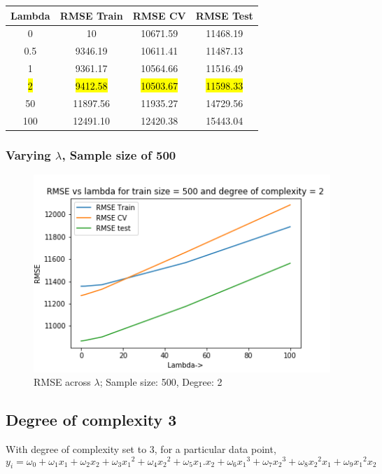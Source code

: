 \documentclass[12pt,a4paper]{article}
\begin{document}
 
\begin{center}
\begin{tabular}{c c c c} 
\hline
\hline
\textbf{Lambda} & \textbf{RMSE Train} & \textbf{RMSE CV} & \textbf{RMSE Test} \\
\hline
\hline
0 & 10 & 10671.59 & 11468.19 \\ 
0.5 & 9346.19 & 10611.41 & 11487.13 \\
1 & 9361.17 & 10564.66 & 11516.49 \\
\hl{2} & \hl{9412.58} & \hl{10503.67} & \hl{11598.33} \\
50 & 11897.56 & 11935.27 & 14729.56  \\ 
100 & 12491.10 & 12420.38 & 15443.04 \\
\hline
\end{tabular}
\label{d250}
\end{center}
 
\subsubsection{Varying $\lambda$, Sample size of 500}
\begin{figure}[H]
     \centering
     \includegraphics[scale=0.7]{images/d2_500.png}
     \caption{RMSE across $\lambda$; Sample size: 500, Degree: 2}
     \label{fig:d2500}
\end{figure}
 



\subsection{Degree of complexity 3}
With degree of complexity set to 3, for a particular data point, 
\begin{equation}
y_{i}=\omega_{0}+\omega_{1}{x_1}+\omega_{2}{x_2}+\omega_{3}{x_1}^2+\omega_{4}{x_2}^2+\omega_{5}{x_1}.{x_2}+\omega_{6}{x_1}^{3}+\omega_7{x_2}^{3}+\omega_8{x_2}^2{x_1}+\omega_9{x_1}^2{x_2}  
\end{equation}
\end{document}
